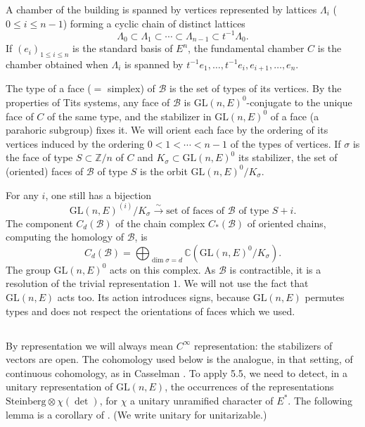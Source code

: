 \documentclass[11pt,a4paper]{article}
\theoremstyle{plain}
\theoremstyle{definition}
\newcommand{\Z}{\mathbb{Z}}
\newcommand{\C}{\mathbb{C}}
\newcommand{\GL}{\mathrm{GL}}
\begin{document}
A chamber of the building is spanned by vertices represented by lattices $\Lambda_i$ ($0 \leq i \leq n-1$) forming a cyclic chain of distinct lattices
\[
\Lambda_0 \subset \Lambda_1 \subset \cdots \subset \Lambda_{n-1} \subset t^{-1} \Lambda_0.
\]
If $(e_i)_{1 \leq i \leq n}$ is the standard basis of $E^n$, the fundamental chamber $C$ is the chamber obtained when $\Lambda_i$ is spanned by $t^{-1}e_1, \ldots, t^{-1}e_i, e_{i+1}, \ldots, e_n$.

The type of a face ($=$ simplex) of $\mathcal{B}$ is the set of types of its vertices. By the properties of Tits systems, any face of $\mathcal{B}$ is $\GL(n,E)^0$-conjugate to the unique face of $C$ of the same type, and the stabilizer in $\GL(n,E)^0$ of a face (a parahoric subgroup) fixes it. We will orient each face by the ordering of its vertices induced by the ordering $0 < 1 < \cdots < n-1$ of the types of vertices. If $\sigma$ is the face of type $S \subset \Z/n$ of $C$ and $K_\sigma \subset \GL(n,E)^0$ its stabilizer, the set of (oriented) faces of $\mathcal{B}$ of type $S$ is the orbit $\GL(n,E)^0 / K_\sigma$.

For any $i$, one still has a bijection
\begin{equation}
\GL(n,E)^{(i)} / K_\sigma \xrightarrow{\sim} \text{set of faces of $\mathcal{B}$ of type $S+i$}. \tag{5.6.3}
\end{equation}
The component $C_d(\mathcal{B})$ of the chain complex $C_*(\mathcal{B})$ of oriented chains, computing the homology of $\mathcal{B}$, is
\begin{equation}
C_d(\mathcal{B}) = \bigoplus_{\dim \sigma = d} \C(\GL(n,E)^0 / K_\sigma). \tag{5.6.4}
\end{equation}
The group $\GL(n,E)^0$ acts on this complex. As $\mathcal{B}$ is contractible, it is a resolution of the trivial representation $1$. We will not use the fact that $\GL(n,E)$ acts too. Its action introduces signs, because $\GL(n,E)$ permutes types and does not respect the orientations of faces which we used.

\subsection{}
By representation we will always mean $C^\infty$ representation: the stabilizers of vectors are open. The cohomology used below is the analogue, in that setting, of continuous cohomology, as in Casselman \cite{C}. To apply 5.5, we need to detect, in a unitary representation of $\GL(n,E)$, the occurrences of the representations $\text{Steinberg} \otimes \chi(\det)$, for $\chi$ a unitary unramified character of $E^*$. The following lemma is a corollary of \cite{C}. (We write unitary for unitarizable.)
\end{document}
